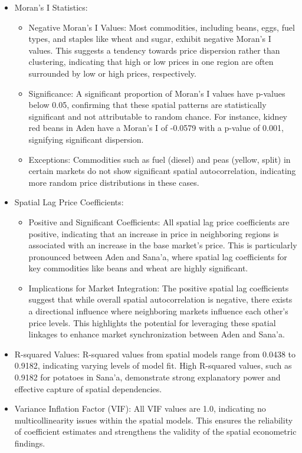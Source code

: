 \begin{itemize}
\item Moran's I Statistics:
  \begin{itemize}
  \item Negative Moran's I Values: Most commodities, including beans, eggs, fuel types, and staples like wheat and sugar, exhibit negative Moran's I values. This suggests a tendency towards price dispersion rather than clustering, indicating that high or low prices in one region are often surrounded by low or high prices, respectively.
  
  \item Significance: A significant proportion of Moran's I values have p-values below 0.05, confirming that these spatial patterns are statistically significant and not attributable to random chance. For instance, kidney red beans in Aden have a Moran's I of -0.0579 with a p-value of 0.001, signifying significant dispersion.
  
  \item Exceptions: Commodities such as fuel (diesel) and peas (yellow, split) in certain markets do not show significant spatial autocorrelation, indicating more random price distributions in these cases.
  \end{itemize}

\item Spatial Lag Price Coefficients:
  \begin{itemize}
  \item Positive and Significant Coefficients: All spatial lag price coefficients are positive, indicating that an increase in price in neighboring regions is associated with an increase in the base market's price. This is particularly pronounced between Aden and Sana'a, where spatial lag coefficients for key commodities like beans and wheat are highly significant.
  
  \item Implications for Market Integration: The positive spatial lag coefficients suggest that while overall spatial autocorrelation is negative, there exists a directional influence where neighboring markets influence each other's price levels. This highlights the potential for leveraging these spatial linkages to enhance market synchronization between Aden and Sana'a.
  \end{itemize}

\item R-squared Values: R-squared values from spatial models range from 0.0438 to 0.9182, indicating varying levels of model fit. High R-squared values, such as 0.9182 for potatoes in Sana'a, demonstrate strong explanatory power and effective capture of spatial dependencies.

\item Variance Inflation Factor (VIF): All VIF values are 1.0, indicating no multicollinearity issues within the spatial models. This ensures the reliability of coefficient estimates and strengthens the validity of the spatial econometric findings.
\end{itemize}

